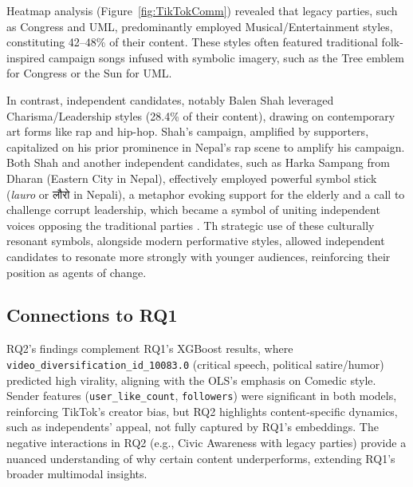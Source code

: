 \documentclass[12pt,a4paper]{report}
\begin{document}
\newpage
Heatmap analysis (Figure~\ref{fig:TikTokComm}) revealed that legacy parties, such as Congress and UML, predominantly employed Musical/Entertainment styles, constituting 42--48\% of their content. These styles often featured traditional folk-inspired campaign songs infused with symbolic imagery, such as the Tree emblem for Congress or the Sun for UML. 

In contrast, independent candidates, notably Balen Shah leveraged Charisma/Leadership styles (28.4\% of their content), drawing on contemporary art forms like rap and hip-hop. Shah’s campaign, amplified by supporters, capitalized on his prior prominence in Nepal’s rap scene to amplify his campaign. Both Shah and another independent candidates, such as Harka Sampang from Dharan (Eastern City in Nepal), effectively employed powerful symbol stick (\textit{lauro} or \texthindi{लौरो} in Nepali), a metaphor evoking support for the elderly and a call to challenge corrupt leadership, which became a symbol of uniting independent voices opposing the traditional parties \parencite{AnnapurnaExpress2022}. Th strategic use of these culturally resonant symbols, alongside modern performative styles, allowed independent candidates to resonate more strongly with younger audiences, reinforcing their position as agents of change.


\subsection{Connections to RQ1}
RQ2’s findings complement RQ1’s XGBoost results, where \texttt{video\_diversification\_id\_10083.0} (critical speech, political satire/humor) predicted high virality, aligning with the OLS’s emphasis on Comedic style. Sender features (\texttt{user\_like\_count}, \texttt{followers}) were significant in both models, reinforcing TikTok’s creator bias, but RQ2 highlights content-specific dynamics, such as independents’ appeal, not fully captured by RQ1’s embeddings. The negative interactions in RQ2 (e.g., Civic Awareness with legacy parties) provide a nuanced understanding of why certain content underperforms, extending RQ1’s broader multimodal insights.
\newpage
\end{document}
